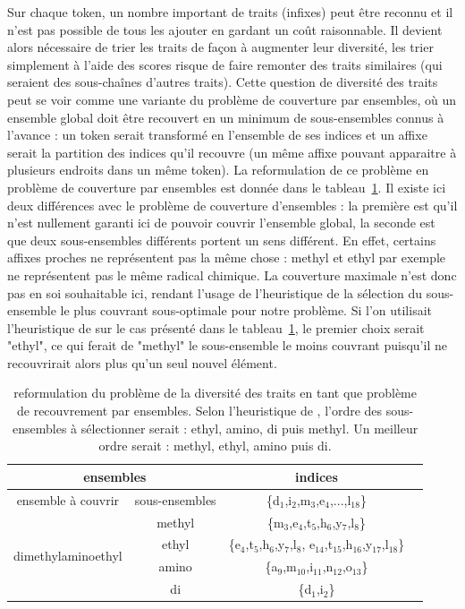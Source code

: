 \documentclass[12pt,a4paper,times,twoside,openright]{report}
\begin{document}
Sur chaque token, un nombre important de traits (infixes) peut être reconnu et il n'est pas possible de tous les ajouter en gardant un coût raisonnable. Il devient alors nécessaire de trier les traits de façon à augmenter leur diversité, les trier simplement à l'aide des scores risque de faire remonter des traits similaires (qui seraient des sous-chaînes d'autres traits). Cette question de diversité des traits peut se voir comme une variante du problème de couverture par ensembles, où un ensemble global doit être recouvert en un minimum de sous-ensembles connus à l'avance : un token serait transformé en l'ensemble de ses indices et un affixe serait la partition des indices qu'il recouvre (un même affixe pouvant apparaitre à plusieurs endroits dans un même token). La reformulation de ce problème en problème de couverture par ensembles est donnée dans le tableau\ \ref{tab:substrings-as-covering}. Il existe ici deux différences avec le problème de couverture d'ensembles : la première est qu'il n'est nullement garanti ici de pouvoir couvrir l'ensemble global, la seconde est que deux sous-ensembles différents portent un sens différent. En effet, certains affixes proches ne représentent pas la même chose : methyl et ethyl par exemple ne représentent pas le même radical chimique. La couverture maximale n'est donc pas en soi souhaitable ici, rendant l'usage de l'heuristique de la sélection du sous-ensemble le plus couvrant \citep{chvatal1979greedy} sous-optimale pour notre problème. Si l'on utilisait l'heuristique de \citet{chvatal1979greedy} sur le cas présenté dans le tableau\ \ref{tab:substrings-as-covering}, le premier choix serait "ethyl", ce qui ferait de "methyl" le sous-ensemble le moins couvrant puisqu'il ne recouvrirait alors plus qu'un seul nouvel élément.

\begin{table}[ht!]
\centering
\begin{tabular}{|c|c|c|c|}
\hline
\multicolumn{2}{|c|}{ensembles}                      & indices\\
\hline
ensemble à couvrir                  & sous-ensembles & \{d$_{1}$,i$_{2}$,m$_{3}$,e$_{4}$,...,l$_{18}$\} \\
\hline
\multirow{4}{*}{dimethylaminoethyl} & methyl         & \{m$_{3}$,e$_{4}$,t$_{5}$,h$_{6}$,y$_{7}$,l$_{8}$\} \\
                                    & ethyl          & \{e$_{4}$,t$_{5}$,h$_{6}$,y$_{7}$,l$_{8}$, e$_{ 14}$,t$_{15}$,h$_{16}$,y$_{17}$,l$_{18}$\} \\
                                    & amino          & \{a$_{9}$,m$_{10}$,i$_{11}$,n$_{12}$,o$_{13}$\} \\
                                    & di             & \{d$_{1}$,i$_{2}$\} \\
\hline
\end{tabular}
\caption{reformulation du problème de la diversité des traits en tant que problème de recouvrement par ensembles. Selon l'heuristique de \citet{chvatal1979greedy}, l'ordre des sous-ensembles à sélectionner serait : ethyl, amino, di puis methyl. Un meilleur ordre serait : methyl, ethyl, amino puis di.}
\label{tab:substrings-as-covering}
\end{table}
\end{document}
